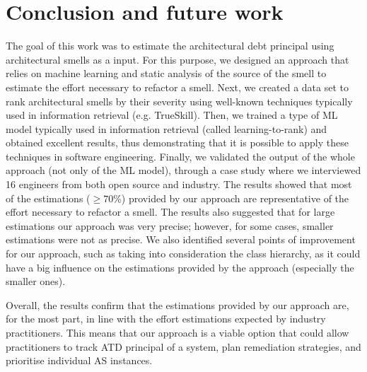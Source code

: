 
\section{Conclusion and future work}\label{c6:sec:conclusion-fw}
The goal of this work was to estimate the architectural debt principal using architectural smells as a input.
For this purpose, we designed an approach that relies on machine learning and static analysis of the source of the smell to estimate the effort necessary to refactor a smell.
Next, we created a data set to rank architectural smells by their severity using well-known techniques typically used in information retrieval (e.g. TrueSkill).
Then, we trained a type of ML model typically used in information retrieval (called learning-to-rank) and obtained excellent results, thus demonstrating that it is possible to apply these techniques in software engineering.
Finally, we validated the output of the whole approach (not only of the ML model), through a case study where we interviewed 16 engineers from both open source and industry.
The results showed that most of the estimations ($\ge 70$\%) provided by our approach are representative of the effort necessary to refactor a smell.
The results also suggested that for large estimations our approach was very precise; however, for some cases, smaller estimations were not as precise.
We also identified several points of improvement for our approach, such as taking into consideration the class hierarchy, as it could have a big influence on the estimations provided by the approach (especially the smaller ones).

Overall, the results confirm that the estimations provided by our approach are, for the most part, in line with the effort estimations expected by industry practitioners.
This means that our approach is a viable option that could allow practitioners to track ATD principal of a system, plan remediation strategies, and prioritise individual AS instances.

